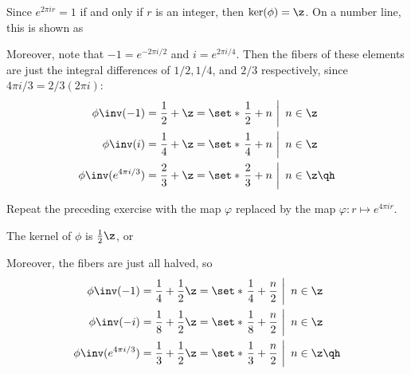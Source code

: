 \begin{sol}
    Since $e^{2\pi ir} = 1$ if and only if $r$ is an integer, then $\ker(\phi) = \z$. On a number line, this is shown as
    \begin{center}
    \end{center}
    Moreover, note that $-1 = e^{-2\pi i/2}$ and $i = e^{2\pi i/4}$. Then the fibers of these elements are just the integral differences of $1/2, 1/4$, and $2/3$ respectively, since $4\pi i/3 = 2/3(2\pi i)$:
    \begin{align*}
        \phi\inv(-1) & = \frac 12 + \z = \set*{\left.\frac 12 + n~\right|~n \in \z} \\
        \phi\inv(i) & = \frac 14 + \z = \set*{\left.\frac 14 + n~\right|~n \in \z} \\
        \phi\inv(e^{4\pi i/3}) & = \frac 23 + \z = \set*{\left.\frac 23 + n~\right|~n \in \z} \qh
    \end{align*}
\end{sol}

\begin{exercise}\label{ex3.1.13}
    Repeat the preceding exercise with the map $\varphi$ replaced by the map $\varphi : r \mapsto e^{4\pi i r}$.
\end{exercise}

\begin{sol}
    The kernel of $\phi$ is $\frac12\z$, or
    \begin{center}
    \end{center}
    Moreover, the fibers are just all halved, so
    \begin{align*}
        \phi\inv(-1) & = \frac14 + \frac12 \z = \set*{\left.\frac14 + \frac n2~\right|~n \in \z} \\
        \phi\inv(-i) & = \frac18 + \frac12 \z = \set*{\left.\frac18 + \frac n2~\right|~n \in \z} \\
        \phi\inv(e^{4\pi i/3}) & = \frac13 + \frac12 \z = \set*{\left.\frac13 + \frac n2~\right|~n \in \z} \qh
    \end{align*}
\end{sol}

